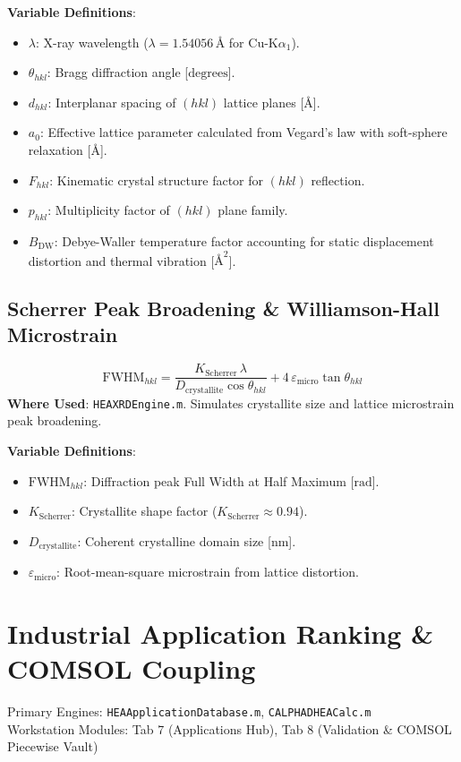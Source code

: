 \documentclass[11pt,a4paper]{article}
\begin{document}
\noindent\textbf{Variable Definitions}:
\begin{itemize}
  \item $\lambda$: X-ray wavelength ($\lambda = 1.54056 \, \text{\AA}$ for $\text{Cu-K}\alpha_1$).
  \item $\theta_{hkl}$: Bragg diffraction angle [$\text{degrees}$].
  \item $d_{hkl}$: Interplanar spacing of $(hkl)$ lattice planes [$\text{\AA}$].
  \item $a_0$: Effective lattice parameter calculated from Vegard's law with soft-sphere relaxation [$\text{\AA}$].
  \item $F_{hkl}$: Kinematic crystal structure factor for $(hkl)$ reflection.
  \item $p_{hkl}$: Multiplicity factor of $(hkl)$ plane family.
  \item $B_{\text{DW}}$: Debye-Waller temperature factor accounting for static displacement distortion and thermal vibration [$\text{\AA}^2$].
\end{itemize}

\subsection{Scherrer Peak Broadening \& Williamson-Hall Microstrain}
\begin{equation}
\text{FWHM}_{hkl} = \frac{K_{\text{Scherrer}} \, \lambda}{D_{\text{crystallite}} \cos\theta_{hkl}} + 4 \, \varepsilon_{\text{micro}} \tan\theta_{hkl}
\end{equation}
\textbf{Where Used}: \texttt{HEAXRDEngine.m}. Simulates crystallite size and lattice microstrain peak broadening.

\noindent\textbf{Variable Definitions}:
\begin{itemize}
  \item $\text{FWHM}_{hkl}$: Diffraction peak Full Width at Half Maximum [$\text{rad}$].
  \item $K_{\text{Scherrer}}$: Crystallite shape factor ($K_{\text{Scherrer}} \approx 0.94$).
  \item $D_{\text{crystallite}}$: Coherent crystalline domain size [$\text{nm}$].
  \item $\varepsilon_{\text{micro}}$: Root-mean-square microstrain from lattice distortion.
\end{itemize}

\section{Industrial Application Ranking \& COMSOL Coupling}
Primary Engines: \texttt{HEAApplicationDatabase.m}, \texttt{CALPHADHEACalc.m} \\
Workstation Modules: Tab 7 (Applications Hub), Tab 8 (Validation & COMSOL Piecewise Vault)
\end{document}
